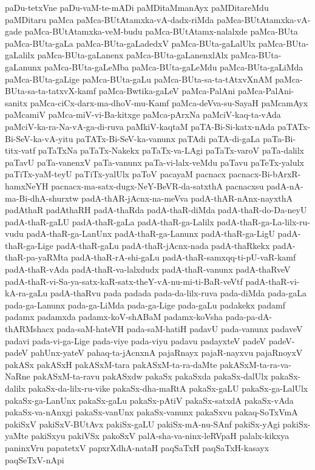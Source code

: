 {paDu-tetxVne
paDu-vaM-te-mADi
paMDitaMmanAyx
paMDitareMdu
paMDitaru
paMca
paMca-BUtAtamxka-vA-dadx-riMda
paMca-BUtAtamxka-vA-gade
paMca-BUtAtamxka-veM-budu
paMca-BUtAtamx-nalalxde
paMca-BUta
paMca-BUta-gaLa
paMca-BUta-gaLadedxV
paMca-BUta-gaLalUlx
paMca-BUta-gaLalilx
paMca-BUta-gaLanenx
paMca-BUta-gaLanenxlAlx
paMca-BUta-gaLanunx
paMca-BUta-gaLeMba
paMca-BUta-gaLeMdu
paMca-BUta-gaLiMda
paMca-BUta-gaLige
paMca-BUta-gaLu
paMca-BUta-sa-ta-tAtxvXnAM
paMca-BUta-sa-ta-tatxvX-kamf
paMca-Bwtika-gaLeV
paMca-PalAni
paMca-PalAni-sanitx
paMca-ciCx-darx-ma-dhoV-mu-Kamf
paMca-deVva-su-SayaH
paMcamAyx
paMcamiV
paMca-miV-vi-Ba-kitxge
paMca-pArxNa
paMciV-kaq-ta-vAda
paMciV-ka-ra-Na-vA-ga-di-ruva
paMkiV-kaqtaM
paTA-Bi-Si-katx-nAda
paTATx-Bi-SeV-ka-vA-yitu
paTATx-Bi-SeV-ka-vanunx
paTAdi
paTA-di-gaLa
paTa-Bi-titx-vatf
paTaTxNa
paTaTx-Nakekx
paTaTx-va-LAgi
paTaTx-varoV
paTa-dalilx
paTavU
paTa-vanenxV
paTa-vanunx
paTa-vi-lalx-veMdu
paTavu
paTeTx-yalulx
paTiTx-yaM-teyU
paTiTx-yalUlx
paToV
pacayaM
pacnacx
pacnacx-Bi-bArxR-hamxNeYH
pacnacx-ma-satx-dugx-NeY-BeVR-da-satxthA
pacnacxsu
padA-nA-ma-Bi-dhA-shurxtw
padA-thAR-jAcnx-na-meVva
padA-thAR-nAnx-nayxthA
padAthaR
padAthaRH
padA-thaRda
padA-thaR-diMda
padA-thaR-do-Da-neyU
padA-thaR-gaLU
padA-thaR-gaLa
padA-thaR-ga-Lalilx
padA-thaR-ga-La-lilx-ru-vudu
padA-thaR-ga-LanUnx
padA-thaR-ga-Lanunx
padA-thaR-ga-LigU
padA-thaR-ga-Lige
padA-thaR-gaLu
padA-thaR-jAcnx-nada
padA-thaRkekx
padA-thaR-pa-yaRMta
padA-thaR-rA-shi-gaLu
padA-thaR-samxqq-ti-pU-vaR-kamf
padA-thaR-vAda
padA-thaR-va-lalxdudx
padA-thaR-vanunx
padA-thaRveV
padA-thaR-vi-Sa-ya-satx-kaR-satx-theY-vA-nu-mi-ti-BaR-veVtf
padA-thaR-vi-kA-ra-gaLu
padA-thaRvu
pada
padada
pada-da-lilx-ruva
pada-diMda
pada-gaLa
pada-ga-Lanunx
pada-ga-LiMda
pada-ga-Lige
pada-gaLu
padakekx
padamf
padamx
padamxda
padamx-koV-shABaM
padamx-koVsha
pada-pa-dA-thARMshacx
pada-saM-hateVH
pada-saM-hatiH
padavU
pada-vanunx
padaveV
padavi
pada-vi-ga-Lige
pada-viye
pada-viyu
padavu
padayxteV
padeV
padeV-padeV
pahUnx-yateV
pahaq-ta-jAcnxnA
pajaRnayx
pajaR-nayxvu
pajaRnoyxV
pakASx
pakASxH
pakASxM-tara
pakASxM-ta-ra-daMte
pakASxM-ta-ra-va-NaRne
pakASxM-ta-ravu
pakASxdw
pakaSx
pakaSxda
pakaSx-dalUlx
pakaSx-dalilx
pakaSx-da-lilx-ru-vike
pakaSx-dha-maRtA
pakaSx-gaLU
pakaSx-ga-LalUlx
pakaSx-ga-LanUnx
pakaSx-gaLu
pakaSx-pAtiV
pakaSx-satxdA
pakaSx-vAda
pakaSx-va-nAnxgi
pakaSx-vanUnx
pakaSx-vanunx
pakaSxvu
pakaq-SoTxVmA
pakiSxV
pakiSxV-BUtAvx
pakiSx-gaLU
pakiSx-mA-nu-SAnf
pakiSx-yAgi
pakiSx-yaMte
pakiSxyu
pakiVSx
pakoSxV
palA-sha-va-ninx-leRVpaH
palalx-kikxya
paninxVru
papatetxV
papxrXdhA-nataH
paqSaTxH
paqSaTxH-kasayx
paqSeTxV-nApi
}
